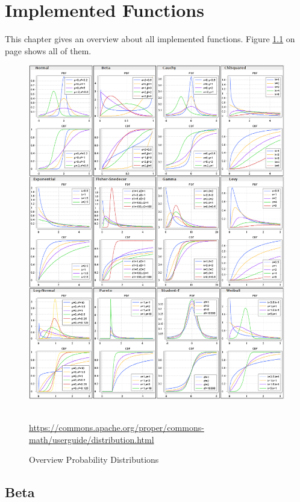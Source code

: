 
\chapter{Implemented Functions}

	This chapter gives an overview about all implemented functions. Figure \ref{fig:OverviewProbabilityDistributions} on page \pageref{fig:OverviewProbabilityDistributions} shows all of them.

	\begin{figure}[h]
		\centering
		\includegraphics[width=1\textwidth]{Figures/OverviewProbabilityDistributions}~\\
		\caption{Overview Probability Distributions}
		\url{https://commons.apache.org/proper/commons-math/userguide/distribution.html}
		\label{fig:OverviewProbabilityDistributions}
	\end{figure}

	\section{Beta}

